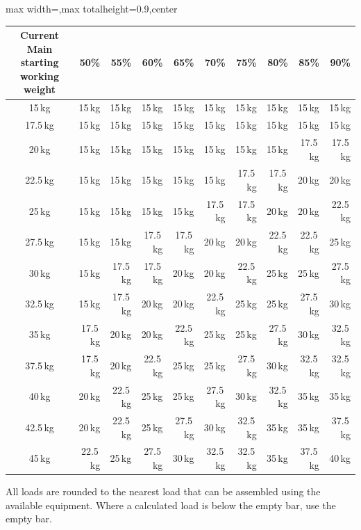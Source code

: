 \documentclass[11pt,a4paper]{article}
\newcommand{\tablearraystretch}{1.15}
\begin{document}
\begin{center}
\renewcommand{\arraystretch}{\tablearraystretch}
\begin{adjustbox}{max width=\linewidth,max totalheight=0.9\textheight,center}
\begin{tabular}{crrrrrrrrr}
\toprule
Current Main starting working weight & 50\% & 55\% & 60\% & 65\% & 70\% & 75\% & 80\% & 85\% & 90\% \\
\midrule
15\,kg   & 15\,kg & 15\,kg & 15\,kg & 15\,kg & 15\,kg & 15\,kg & 15\,kg & 15\,kg & 15\,kg \\
17.5\,kg & 15\,kg & 15\,kg & 15\,kg & 15\,kg & 15\,kg & 15\,kg & 15\,kg & 15\,kg & 15\,kg \\
20\,kg   & 15\,kg & 15\,kg & 15\,kg & 15\,kg & 15\,kg & 15\,kg & 15\,kg & 17.5\,kg & 17.5\,kg \\
22.5\,kg & 15\,kg & 15\,kg & 15\,kg & 15\,kg & 15\,kg & 17.5\,kg & 17.5\,kg & 20\,kg & 20\,kg \\
25\,kg   & 15\,kg & 15\,kg & 15\,kg & 15\,kg & 17.5\,kg & 17.5\,kg & 20\,kg & 20\,kg & 22.5\,kg \\
27.5\,kg & 15\,kg & 15\,kg & 17.5\,kg & 17.5\,kg & 20\,kg & 20\,kg & 22.5\,kg & 22.5\,kg & 25\,kg \\
30\,kg   & 15\,kg & 17.5\,kg & 17.5\,kg & 20\,kg & 20\,kg & 22.5\,kg & 25\,kg & 25\,kg & 27.5\,kg \\
32.5\,kg & 15\,kg & 17.5\,kg & 20\,kg & 20\,kg & 22.5\,kg & 25\,kg & 25\,kg & 27.5\,kg & 30\,kg \\
35\,kg   & 17.5\,kg & 20\,kg & 20\,kg & 22.5\,kg & 25\,kg & 25\,kg & 27.5\,kg & 30\,kg & 32.5\,kg \\
37.5\,kg & 17.5\,kg & 20\,kg & 22.5\,kg & 25\,kg & 25\,kg & 27.5\,kg & 30\,kg & 32.5\,kg & 32.5\,kg \\
40\,kg   & 20\,kg & 22.5\,kg & 25\,kg & 25\,kg & 27.5\,kg & 30\,kg & 32.5\,kg & 35\,kg & 35\,kg \\
42.5\,kg & 20\,kg & 22.5\,kg & 25\,kg & 27.5\,kg & 30\,kg & 32.5\,kg & 35\,kg & 35\,kg & 37.5\,kg \\
45\,kg   & 22.5\,kg & 25\,kg & 27.5\,kg & 30\,kg & 32.5\,kg & 32.5\,kg & 35\,kg & 37.5\,kg & 40\,kg \\
\bottomrule
\end{tabular}
\end{adjustbox}
\renewcommand{\arraystretch}{1}
\end{center}

All loads are rounded to the nearest load that can be assembled using the available equipment. Where a calculated load is below the empty bar, use the empty bar.
\end{document}
